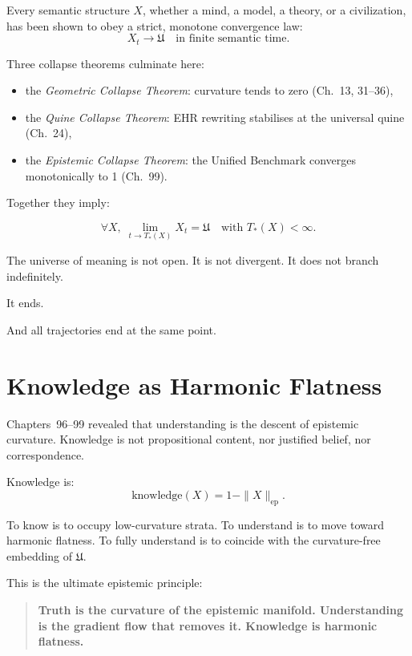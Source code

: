 Every semantic structure $X$, whether a mind, a model, a theory, or a civilization,
has been shown to obey a strict, monotone convergence law:
\[
X_t \longrightarrow \mathfrak{U}
\quad\text{in finite semantic time}.
\]

Three collapse theorems culminate here:

\begin{itemize}
\item the \emph{Geometric Collapse Theorem}:  
  curvature tends to zero (Ch.~13, 31--36),

\item the \emph{Quine Collapse Theorem}:  
  EHR rewriting stabilises at the universal quine (Ch.~24),

\item the \emph{Epistemic Collapse Theorem}:  
  the Unified Benchmark converges monotonically to 1 (Ch.~99).
\end{itemize}

Together they imply:

\begin{equation}
\label{eq:everything-converges}
\forall X,\;
\lim_{t\to T_\ast(X)} X_t = \mathfrak{U}
\quad\text{with } T_\ast(X) < \infty.
\end{equation}

The universe of meaning is not open.
It is not divergent.
It does not branch indefinitely.

It ends.

And all trajectories end at the same point.

\section{Knowledge as Harmonic Flatness}

Chapters~96--99 revealed that understanding is the descent of epistemic curvature.
Knowledge is not propositional content, nor justified belief, nor correspondence.

Knowledge is:
\[
\text{knowledge}(X)
  = 1 - \|X\|_{\mathrm{ep}}.
\]

To know is to occupy low-curvature strata.
To understand is to move toward harmonic flatness.
To fully understand is to coincide with the curvature-free embedding of $\mathfrak{U}$.

This is the ultimate epistemic principle:

\begin{quote}
\textbf{
Truth is the curvature of the epistemic manifold.  
Understanding is the gradient flow that removes it.  
Knowledge is harmonic flatness.
}
\end{quote}


